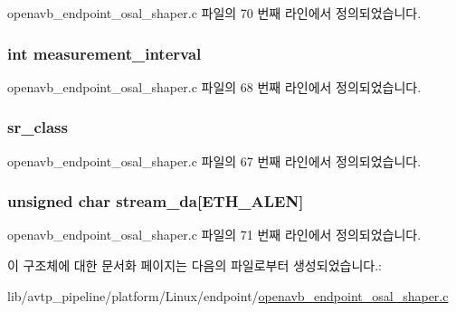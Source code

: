 openavb\+\_\+endpoint\+\_\+osal\+\_\+shaper.\+c 파일의 70 번째 라인에서 정의되었습니다.

\subsubsection[{\texorpdfstring{measurement\+\_\+interval}{measurement_interval}}]{\setlength{\rightskip}{0pt plus 5cm}int measurement\+\_\+interval}\hypertarget{structshaper__reservation_a848591ef9ab34f6f2eb816fe385fa4d4}{}\label{structshaper__reservation_a848591ef9ab34f6f2eb816fe385fa4d4}


openavb\+\_\+endpoint\+\_\+osal\+\_\+shaper.\+c 파일의 68 번째 라인에서 정의되었습니다.

\subsubsection[{\texorpdfstring{sr\+\_\+class}{sr_class}}]{ sr\+\_\+class}\hypertarget{structshaper__reservation_abd9f3cf34e5587f607b96c77560cc374}{}\label{structshaper__reservation_abd9f3cf34e5587f607b96c77560cc374}


openavb\+\_\+endpoint\+\_\+osal\+\_\+shaper.\+c 파일의 67 번째 라인에서 정의되었습니다.

\subsubsection[{\texorpdfstring{stream\+\_\+da}{stream_da}}]{\setlength{\rightskip}{0pt plus 5cm}unsigned char {\bf stream\+\_\+da}\mbox{[}{\bf E\+T\+H\+\_\+\+A\+L\+EN}\mbox{]}}\hypertarget{structshaper__reservation_a29385104cedd9af8244dc9000ebb0929}{}\label{structshaper__reservation_a29385104cedd9af8244dc9000ebb0929}


openavb\+\_\+endpoint\+\_\+osal\+\_\+shaper.\+c 파일의 71 번째 라인에서 정의되었습니다.



이 구조체에 대한 문서화 페이지는 다음의 파일로부터 생성되었습니다.\+:\begin{DoxyCompactItemize}
\item 
lib/avtp\+\_\+pipeline/platform/\+Linux/endpoint/\hyperlink{openavb__endpoint__osal__shaper_8c}{openavb\+\_\+endpoint\+\_\+osal\+\_\+shaper.\+c}\end{DoxyCompactItemize}
